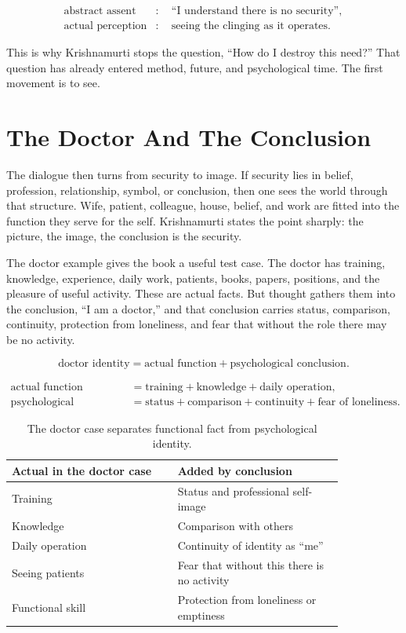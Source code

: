 \documentclass[11pt,oneside]{book}
\begin{document}
\begin{align}
\text{abstract assent}
&:\quad
\text{``I understand there is no security''},\\
\text{actual perception}
&:\quad
\text{seeing the clinging as it operates}.
\end{align}

This is why Krishnamurti stops the question, ``How do I destroy this need?'' That question has already entered method, future, and psychological time. The first movement is to see.

\section{The Doctor And The Conclusion}

The dialogue then turns from security to image. If security lies in belief, profession, relationship, symbol, or conclusion, then one sees the world through that structure. Wife, patient, colleague, house, belief, and work are fitted into the function they serve for the self. Krishnamurti states the point sharply: the picture, the image, the conclusion is the security.

The doctor example gives the book a useful test case. The doctor has training, knowledge, experience, daily work, patients, books, papers, positions, and the pleasure of useful activity. These are actual facts. But thought gathers them into the conclusion, ``I am a doctor,'' and that conclusion carries status, comparison, continuity, protection from loneliness, and fear that without the role there may be no activity.

\begin{equation}
\text{doctor identity}
=
\text{actual function}
+
\text{psychological conclusion}.
\end{equation}

\begin{align}
\text{actual function}
&=
\text{training}
+
\text{knowledge}
+
\text{daily operation},\\
\text{psychological conclusion}
&=
\text{status}
+
\text{comparison}
+
\text{continuity}
+
\text{fear of loneliness}.
\end{align}

\begin{table}
\centering
\begin{tabular}{|p{0.42\linewidth}|p{0.42\linewidth}|}
\hline
\textbf{Actual in the doctor case} & \textbf{Added by conclusion} \\
\hline
Training & Status and professional self-image \\
\hline
Knowledge & Comparison with others \\
\hline
Daily operation & Continuity of identity as ``me'' \\
\hline
Seeing patients & Fear that without this there is no activity \\
\hline
Functional skill & Protection from loneliness or emptiness \\
\hline
\end{tabular}
\caption{The doctor case separates functional fact from psychological identity.}
\end{table}
\end{document}
